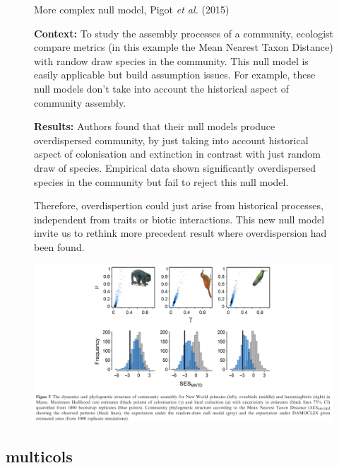 \documentclass[12pt,a4paper,notitlepage,colorinlistoftodos]{article}
\begin{document}
\begin{figure}[h] %
\begin{bluebox}{More complex null model, Pigot \textit{et al.} (2015) \\}

\textbf{Context: }To study the assembly processes of a community, ecologist compare metrics (in this example the Mean Nearest Taxon Distance) with randow draw species in the community. This null model is easily applicable but build assumption issues. For example, these null models don't take into account the historical aspect of community assembly.

\textbf{Results: }Authors found that their null models produce overdispersed community, by just taking into account historical aspect of colonisation and extinction in contrast with just random draw of species. Empirical data shown significantly  overdispersed species in the community but fail to reject this null model. 

Therefore, overdispertion could just arise from historical processes, independent from traits or biotic interactions. This new null model invite us to rethink more precedent result where overdispersion had been found.

\includegraphics[width=\textwidth]{fig/Pigot2015.png}
\label{box:Pigot}
\end{bluebox}
\end{figure}

\lipsum[1-3]

\subsection{multicols}
\end{document}

